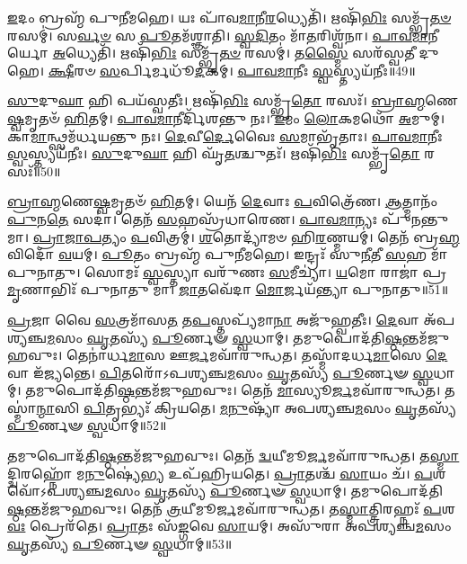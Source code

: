 \-\ul{𑌇}\-𑌦𑌂 𑌬𑍍𑌰𑌹𑍍𑌮᳴ 𑌪𑍁𑌨𑍀𑌮𑌹𑍇।
𑌯𑌃 𑌪𑌾᳴𑌵\-\ul{𑌮𑌾}\-𑌨𑍀\-\ul{𑌰}\-𑌧𑍍𑌯𑍇𑌤𑌿᳴।
𑌋𑌷𑌿᳴\-\ul{𑌭𑌿𑌃} 𑌸𑌮𑍍𑌭𑍃᳴\-\ul{𑌤}\-\-\ul{𑍞} 𑌰𑌸𑌮𑍍॑।
𑌸\-\ul{𑌰𑍍𑌵}\-\-\ul{𑍞} 𑌸 \ul{𑌪𑍂}\-𑌤𑌮᳴𑌶𑍍𑌞𑌾𑌤𑌿।
\-\ul{𑌸𑍍𑌵}\-\-\ul{𑌦𑌿}\-𑌤𑌂 𑌮𑌾᳴\-\ul{𑌤}\-𑌰𑌿𑌶𑍍𑌵᳴𑌨𑌾।
\-\ul{𑌪𑌾}\-\-\ul{𑌵}\-\-\ul{𑌮𑌾}\-𑌨𑍀𑌰𑍍𑌯𑍋 \ul{𑌅}\-𑌧𑍍𑌯𑍇𑌤𑌿᳴।
𑌋𑌷𑌿᳴\-\ul{𑌭𑌿𑌃} 𑌸𑌮𑍍𑌭𑍃᳴\-\ul{𑌤}\-\-\ul{𑍞} 𑌰𑌸𑌮𑍍॑।
𑌤\-\ul{𑌸𑍍𑌮𑍈} 𑌸𑌰᳴𑌸𑍍𑌵𑌤𑍀 𑌦𑍁𑌹𑍇।
\-\ul{𑌕𑍍𑌷𑍀}\-𑌰𑍞 \ul{𑌸}\-𑌰𑍍𑌪𑌿𑌰𑍍𑌮𑌧𑍂᳴\-\ul{𑌦}\-𑌕𑌮𑍍।
\-\ul{𑌪𑌾}\-\-\ul{𑌵}\-\-\ul{𑌮𑌾}\-𑌨𑍀𑌃 \ul{𑌸𑍍𑌵}\-𑌸𑍍𑌤𑍍𑌯𑌯᳴𑌨𑍀𑌃॥49॥

\-\ul{𑌸𑍁}\-𑌦𑍁\-\ul{𑌘𑌾} 𑌹𑌿 𑌪𑌯᳴𑌸𑍍𑌵𑌤𑍀𑌃।
𑌋𑌷𑌿᳴\-\ul{𑌭𑌿𑌃} 𑌸𑌮𑍍𑌭𑍃᳴\-\ul{𑌤𑍋} 𑌰𑌸𑌃᳴।
\-\ul{𑌬𑍍𑌰𑌾}\-\-\ul{𑌹𑍍𑌮}\-𑌣𑍇\-\ul{𑌷𑍍𑌵}\-𑌮𑍃𑌤𑍞᳴ \ul{𑌹𑌿}\-𑌤𑌮𑍍।
\-\ul{𑌪𑌾}\-\-\ul{𑌵}\-\-\ul{𑌮𑌾}\-𑌨𑍀𑌰𑍍𑌦𑌿᳴𑌶𑌨𑍍𑌤𑍁 𑌨𑌃।
\-\ul{𑌇}\-𑌮𑌂 \ul{𑌲𑍋}\-𑌕𑌮𑌥𑍋᳴ \ul{𑌅}\-𑌮𑍁𑌮𑍍।
𑌕𑌾\-\ul{𑌮𑌾}\-𑌨𑍍𑌥𑍍𑌸𑌮᳴𑌰𑍍𑌧𑌯𑌨𑍍𑌤𑍁 𑌨𑌃।
\-\ul{𑌦𑍇}\-𑌵𑍀\-\ul{𑌰𑍍𑌦𑍇}\-𑌵𑍈𑌃 \ul{𑌸}\-𑌮𑌾𑌭𑍃᳴𑌤𑌾𑌃।
\-\ul{𑌪𑌾}\-\-\ul{𑌵}\-\-\ul{𑌮𑌾}\-𑌨𑍀𑌃 \ul{𑌸𑍍𑌵}\-𑌸𑍍𑌤𑍍𑌯𑌯᳴𑌨𑍀𑌃।
\-\ul{𑌸𑍁}\-𑌦𑍁\-\ul{𑌘𑌾} 𑌹𑌿 𑌘𑍃᳴\-\ul{𑌤}\-𑌶𑍍𑌚𑍁𑌤𑌃᳴।
𑌋𑌷𑌿᳴\-\ul{𑌭𑌿𑌃} 𑌸𑌮𑍍𑌭𑍃᳴\-\ul{𑌤𑍋} 𑌰𑌸𑌃᳴॥50॥

\-\ul{𑌬𑍍𑌰𑌾}\-\-\ul{𑌹𑍍𑌮}\-𑌣𑍇\-\ul{𑌷𑍍𑌵}\-𑌮𑍃𑌤𑍞᳴ \ul{𑌹𑌿}\-𑌤𑌮𑍍।
𑌯𑍇𑌨᳴ \ul{𑌦𑍇}\-𑌵𑌾𑌃 \ul{𑌪}\-𑌵𑌿𑌤𑍍𑌰𑍇᳴𑌣।
\-\ul{𑌆}\-𑌤𑍍𑌮𑌾𑌨𑌂᳴ \ul{𑌪𑍁}\-𑌨\-\ul{𑌤𑍇} 𑌸𑌦𑌾॑।
𑌤𑍇𑌨᳴ \ul{𑌸}\-𑌹𑌸𑍍𑌰᳴𑌧𑌾𑌰𑍇𑌣।
\-\ul{𑌪𑌾}\-\-\ul{𑌵}\-\-\ul{𑌮𑌾}\-𑌨𑍍𑌯𑌃 𑌪𑍁᳴𑌨𑌨𑍍𑌤𑍁 𑌮𑌾।
\-\ul{𑌪𑍍𑌰𑌾}\-\-\ul{𑌜𑌾}\-\-\ul{𑌪}\-𑌤𑍍𑌯𑌂 \ul{𑌪}\-𑌵𑌿𑌤𑍍𑌰𑌮𑍍॑।
\-\ul{𑌶}\-𑌤𑍋𑌦𑍍𑌯𑌾᳴𑌮𑍞 𑌹𑌿\-\ul{𑌰}\-𑌣𑍍𑌮𑌯𑌮𑍍॑।
𑌤𑍇𑌨᳴ 𑌬𑍍𑌰\-\ul{𑌹𑍍𑌮}\-𑌵𑌿𑌦𑍋᳴ \ul{𑌵}\-𑌯𑌮𑍍।
\-\ul{𑌪𑍂}\-𑌤𑌂 𑌬𑍍𑌰𑌹𑍍𑌮᳴ 𑌪𑍁𑌨𑍀𑌮𑌹𑍇।
𑌇𑌨𑍍𑌦𑍍𑌰𑌃᳴ 𑌸𑍁\-\ul{𑌨𑍀}\-𑌤𑍀 \ul{𑌸}\-𑌹 𑌮𑌾᳴ 𑌪𑍁𑌨𑌾𑌤𑍁।
𑌸𑍋𑌮𑌃᳴ \ul{𑌸𑍍𑌵}\-𑌸𑍍𑌤𑍍𑌯𑌾 𑌵𑌰𑍁᳴𑌣𑌃 \ul{𑌸}\-𑌮𑍀𑌚𑍍𑌯𑌾॑।
\-\ul{𑌯}\-𑌮𑍋 𑌰𑌾𑌜𑌾॑ 𑌪𑍍𑌰\-\ul{𑌮𑍃}\-𑌣𑌾𑌭𑌿𑌃᳴ 𑌪𑍁𑌨𑌾𑌤𑍁 𑌮𑌾।
\-\ul{𑌜𑌾}\-𑌤𑌵𑍇᳴𑌦𑌾 \ul{𑌮𑍋}\-𑌰𑍍𑌜𑌯᳴𑌨𑍍𑌤𑍍𑌯𑌾 𑌪𑍁𑌨𑌾𑌤𑍁॥51॥\anuvakamend[𑌅𑌨𑍁᳴ 𑌰\-\ul{𑌯𑍀}\-𑌣𑌾𑌂 𑌬𑍍𑌰𑌹𑍍𑌮᳴𑌣𑌾 \ul{𑌸𑍍𑌵}\-𑌸𑍍𑌤𑍍𑌯𑌯᳴𑌨𑍀𑌃 \ul{𑌸𑍁}\-𑌦𑍁\-\ul{𑌘𑌾} 𑌹𑌿 𑌘𑍃᳴\-\ul{𑌤}\-𑌶𑍍𑌚𑍁\-\ul{𑌤} 𑌋𑌷𑌿᳴\-\ul{𑌭𑌿𑌃} 𑌸𑌮𑍍𑌭𑍃᳴\-\ul{𑌤𑍋} 𑌰𑌸𑌃᳴ 𑌪𑍁𑌨𑌾\-\ul{𑌤𑍁} 𑌤𑍍𑌰𑍀𑌣𑌿᳴ 𑌚]

\-\ul{𑌪𑍍𑌰}\-𑌜𑌾 𑌵𑍈 \ul{𑌸}\-𑌤𑍍𑌰𑌮𑌾᳴𑌸\-\ul{𑌤} 𑌤\-\ul{𑌪}\-𑌸𑍍𑌤𑌪𑍍𑌯᳴𑌮𑌾\-\ul{𑌨𑌾} 𑌅𑌜𑍁᳴𑌹𑍍𑌵𑌤𑍀𑌃।
\-\ul{𑌦𑍇}\-𑌵𑌾 𑌅᳴𑌪𑌶𑍍𑌯𑌞𑍍𑌚\-\ul{𑌮}\-𑌸𑌂 \ul{𑌘𑍃}\-𑌤𑌸𑍍𑌯᳴ \ul{𑌪𑍂}\-𑌰𑍍𑌣𑍟 \ul{𑌸𑍍𑌵}\-𑌧𑌾𑌮𑍍।
𑌤𑌮𑍁𑌪𑍋𑌦᳴𑌤𑌿\-\ul{𑌷𑍍𑌠}\-𑌨𑍍𑌤𑌮᳴\-𑌜𑍁𑌹𑌵𑍁𑌃।
𑌤𑍇𑌨𑌾॑𑌰𑍍𑌧\-\ul{𑌮𑌾}\-𑌸 𑌊\-\ul{𑌰𑍍𑌜}\-𑌮𑌵𑌾᳴𑌰𑍁𑌨𑍍𑌧𑌤।
𑌤𑌸𑍍𑌮𑌾᳴𑌦𑌰𑍍𑌧\-\ul{𑌮𑌾}\-𑌸𑍇 \ul{𑌦𑍇}\-𑌵𑌾 𑌇᳴𑌜𑍍𑌯𑌨𑍍𑌤𑍇।
\-\ul{𑌪𑌿}\-𑌤𑌰𑍋᳴\-𑌽𑌪𑌶𑍍𑌯𑌞𑍍𑌚\-\ul{𑌮}\-𑌸𑌂 \ul{𑌘𑍃}\-𑌤𑌸𑍍𑌯᳴ \ul{𑌪𑍂}\-𑌰𑍍𑌣𑍟 \ul{𑌸𑍍𑌵}\-𑌧𑌾𑌮𑍍।
𑌤𑌮𑍁𑌪𑍋𑌦᳴𑌤𑌿\-\ul{𑌷𑍍𑌠}\-𑌨𑍍𑌤𑌮᳴𑌜𑍁𑌹𑌵𑍁𑌃।
𑌤𑍇𑌨᳴ \ul{𑌮𑌾}\-𑌸𑍍𑌯𑍂\-\ul{𑌰𑍍𑌜}\-𑌮𑌵𑌾᳴𑌰𑍁𑌨𑍍𑌧𑌤।
𑌤𑌸𑍍𑌮𑌾॑\-\ul{𑌨𑍍𑌮𑌾}\-𑌸𑌿 \ul{𑌪𑌿}\-𑌤𑍃𑌭𑍍𑌯𑌃᳴ 𑌕𑍍𑌰𑌿𑌯𑌤𑍇।
\-\ul{𑌮}\-\-\ul{𑌨𑍁}\-𑌷𑍍𑌯𑌾᳴ 𑌅𑌪𑌶𑍍𑌯𑌞𑍍𑌚\-\ul{𑌮}\-𑌸𑌂 \ul{𑌘𑍃}\-𑌤𑌸𑍍𑌯᳴ \ul{𑌪𑍂}\-𑌰𑍍𑌣𑍟 \ul{𑌸𑍍𑌵}\-𑌧𑌾𑌮𑍍॥52॥

𑌤𑌮𑍁𑌪𑍋𑌦᳴𑌤𑌿\-\ul{𑌷𑍍𑌠}\-𑌨𑍍𑌤𑌮᳴𑌜𑍁𑌹𑌵𑍁𑌃।
𑌤𑍇𑌨᳴ \ul{𑌦𑍍𑌵}\-𑌯𑍀𑌮𑍂\-\ul{𑌰𑍍𑌜}\-𑌮𑌵𑌾᳴𑌰𑍁𑌨𑍍𑌧𑌤।
𑌤\-\ul{𑌸𑍍𑌮𑌾}\-𑌦𑍍𑌦𑍍𑌵𑌿𑌰𑌹𑍍𑌨𑍋᳴ 𑌮\-\ul{𑌨𑍁}\-𑌷𑍍𑌯𑍇॑\-\ul{𑌭𑍍𑌯} 𑌉𑌪᳴𑌹𑍍𑌰𑌿𑌯𑌤𑍇।
\-\ul{𑌪𑍍𑌰𑌾}\-𑌤𑌶𑍍𑌚᳴ \ul{𑌸𑌾}\-𑌯𑌂 𑌚᳴।
\-\ul{𑌪}\-𑌶𑌵𑍋᳴\-𑌽𑌪𑌶𑍍𑌯𑌞𑍍𑌚\-\ul{𑌮}\-𑌸𑌂 \ul{𑌘𑍃}\-𑌤𑌸𑍍𑌯᳴ \ul{𑌪𑍂}\-𑌰𑍍𑌣𑍟 \ul{𑌸𑍍𑌵}\-𑌧𑌾𑌮𑍍।
𑌤𑌮𑍁𑌪𑍋𑌦᳴𑌤𑌿\-\ul{𑌷𑍍𑌠}\-𑌨𑍍𑌤\-𑌮᳴𑌜𑍁𑌹𑌵𑍁𑌃।
𑌤𑍇𑌨᳴ \ul{𑌤𑍍𑌰}\-𑌯𑍀𑌮𑍂\-\ul{𑌰𑍍𑌜}\-𑌮𑌵𑌾᳴𑌰𑍁𑌨𑍍𑌧𑌤।
𑌤\-\ul{𑌸𑍍𑌮𑌾}\-𑌤𑍍𑌤𑍍𑌰𑌿𑌰𑌹𑍍𑌨𑌃᳴ \ul{𑌪}\-𑌶\-\ul{𑌵𑌃} 𑌪𑍍𑌰𑍇𑌰᳴𑌤𑍇।
\-\ul{𑌪𑍍𑌰𑌾}\-𑌤𑌃 𑌸᳴\-\ul{𑌙𑍍𑌗}\-𑌵𑍇 \ul{𑌸𑌾}\-𑌯𑌮𑍍।
𑌅𑌸𑍁᳴𑌰𑌾 𑌅𑌪𑌶𑍍𑌯𑌞𑍍𑌚\-\ul{𑌮}\-𑌸𑌂 \ul{𑌘𑍃}\-𑌤𑌸𑍍𑌯᳴ \ul{𑌪𑍂}\-𑌰𑍍𑌣𑍟 \ul{𑌸𑍍𑌵}\-𑌧𑌾𑌮𑍍॥53॥

